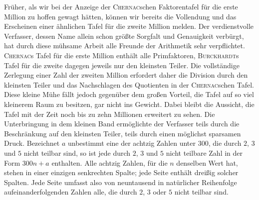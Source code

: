 Früher, als wir bei der Anzeige der \textsc{Chernac}schen Faktorentafel für die erste Million zu hoffen gewagt hätten, können wir bereits die Vollendung und das Erscheinen einer ähnlichen Tafel für die zweite Million melden. Der verdienstvolle Verfasser, dessen Name allein schon größte Sorgfalt und Genauigkeit verbürgt, hat durch diese mühsame Arbeit alle Freunde der Arithmetik sehr verpflichtet. \textsc{Chernac}s Tafel für die erste Million enthält alle Primfaktoren, \textsc{Burckhardt}s Tafel für die zweite dagegen jeweils nur den kleinsten Teiler. Die vollständige Zerlegung einer Zahl der zweiten Million erfordert daher die Division durch den kleinsten Teiler und das Nachschlagen des Quotienten in der \textsc{Chernac}schen Tafel. Diese kleine Mühe fällt jedoch gegenüber dem großen Vorteil, die Tafel auf so viel kleinerem Raum zu besitzen, gar nicht ins Gewicht. Dabei bleibt die Aussicht, die Tafel mit der Zeit noch bis zu zehn Millionen erweitert zu sehen. Die Unterbringung in dem kleinen Band ermöglichte der Verfasser teils durch die Beschränkung auf den kleinsten Teiler, teils durch einen möglichst sparsamen Druck. Bezeichnet $a$ unbestimmt eine der achtzig Zahlen unter $300$, die durch $2$, $3$ und $5$ nicht teilbar sind, so ist jede durch $2$, $3$ und $5$ nicht teilbare Zahl in der Form $300n+a$ enthalten. Alle achtzig Zahlen, für die $n$ denselben Wert hat, stehen in einer einzigen senkrechten Spalte; jede Seite enthält dreißig solcher Spalten. Jede Seite umfasst also von neuntausend in natürlicher Reihenfolge aufeinanderfolgenden Zahlen alle, die durch $2$, $3$ oder $5$ nicht teilbar sind.

